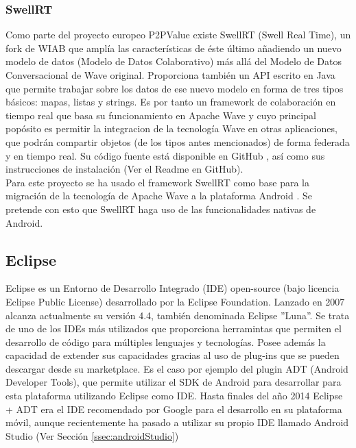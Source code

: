     \subsubsection{SwellRT}\label{sssec:swellRT}
    
    Como parte del proyecto europeo P2PValue \cite{ref:p2pvalue} existe SwellRT (Swell Real Time), un fork de WIAB que amplía las características de éste último añadiendo un nuevo modelo de datos (Modelo de Datos Colaborativo) más allá del Modelo de Datos Conversacional de Wave original. Proporciona también un API escrito en Java que permite trabajar sobre los datos de ese nuevo modelo en forma de tres tipos básicos: mapas, listas y strings. Es por tanto un framework de colaboración en tiempo real que basa su funcionamiento en Apache Wave y cuyo principal popósito es permitir la integracion de la tecnología Wave en otras aplicaciones, que podrán compartir objetos (de los tipos antes mencionados) de forma federada y en tiempo real. Su código fuente está disponible en GitHub \cite{ref:swellRT_github}, así como sus instrucciones de instalación (Ver el Readme en GitHub).\\[.2cm]

    Para este proyecto se ha usado el framework SwellRT como base para la migración de la tecnología de Apache Wave a la plataforma Android \cite{ref:android_platform}. Se pretende con esto que SwellRT haga uso de las funcionalidades nativas de Android.
    
    \subsection{Eclipse}\label{ssec:eclipse} 
    
	Eclipse \cite{ref:eclipse} es un Entorno de Desarrollo Integrado (IDE) open-source (bajo licencia Eclipse Public License) desarrollado por la Eclipse Foundation. Lanzado en 2007 alcanza actualmente su versión 4.4, también denominada Eclipse ''Luna''. Se trata de uno de los IDEs más utilizados que proporciona herramintas que permiten el desarrollo de código para múltiples lenguajes y tecnologías. Posee además la capacidad de extender sus capacidades gracias al uso de plug-ins que se pueden descargar desde su marketplace. Es el caso por ejemplo del plugin ADT (Android Developer Tools), que permite utilizar el SDK de Android para desarrollar para esta plataforma utilizando Eclipse como IDE. Hasta finales del año 2014 Eclipse + ADT era el IDE recomendado por Google para el desarrollo en su plataforma móvil, aunque recientemente ha pasado a utilizar su propio IDE llamado Android Studio (Ver Sección \ref{ssec:androidStudio})
	
